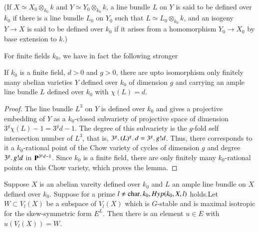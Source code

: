 (If $X \simeq X_0 \otimes_{k_0} k$ and $Y \simeq Y_0 \otimes_{k_0} k$, a line bundle $L$ on $Y$ is said to be defined over $k_0$ if there is a line bundle $L_0$ on $Y_0$ such that $L \simeq L_0 \otimes_{k_0} k$, and an isogeny $Y \to X$ is said to be defined over $k_0$ if it arises from a homomorphism $Y_0 \to X_0$ by base extension to $k$.)

For finite fields $k_0$, we have in fact the following stronger

\begin{lem}\label{apen1-lem1}
If $k_0$ is a finite field, $d > 0$ and $g>0$, there are upto isomorphism only finitely many abelian varieties $Y$ defined over $k_0$ of dimension $g$ and carrying an ample line bundle $L$ defined over $k_0$ with $\chi(L) = d$.
\end{lem}

\begin{proof}
The line bundle $L^3$ on $Y$ is defined over $k_0$ and gives a projective embedding of $Y$ as a $k_0$-closed subvariety of projective space of dimension $3^g \chi (L) -1 = 3^g d -1$. The degree of this subvariety is the $g$-fold self intersection number of $L^3$, that is, $3^g \ldotp (L)^g \ldotp d = 3^g \ldotp g!d $. Thus, there corresponds to it a $k_0$-rational point of the Chow variety of cycles of dimension $g$ and degree $3^g \ldotp g ! d $ in $\mathbf{P}^{3^g d -1}$. Since $k_0$ is a finite field, there are only finitely many $k_0$-rational points on this Chow variety, which proves the lemma.
\end{proof}

\begin{romanstep}\label{apen1-step5}
Suppose $X$ is an abelian vareity defined over $k_0$ and $L$ an ample line bundle on $X$ defined over $k_0$. Suppose for a prime $l \neq \operatorname{char} \ldotp k_0, Hyp (k_0, X, l)$ holds.\pageoriginale Let $W \subset V_l (X)$ be a subspace of $V_l(X)$ which is $G$-stable and is maximal isotropic for the skew-symmetric form $E^L$. Then there is an element $u \in E$ with $u (V_l(X)) =W$.
\end{romanstep}

